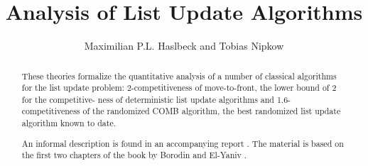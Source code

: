 \documentclass[11pt,a4paper]{article}
\begin{document}
\title{Analysis of List Update Algorithms}
\author{Maximilian P.L. Haslbeck and Tobias Nipkow}
\maketitle

\begin{abstract}
These theories formalize the quantitative analysis of a number of classical algorithms for the list update problem: 2-competitiveness of move-to-front, the lower bound of 2 for the competitive- ness of deterministic list update algorithms and 1.6-competitiveness of the randomized COMB algorithm, the best randomized list update algorithm known to date.

An informal description is found in an accompanying report \cite{HaslbeckN}.
The material is based on the first two chapters of the book by Borodin
and El-Yaniv \cite{BorodinE}.
\end{abstract}

\setcounter{tocdepth}{2}
\tableofcontents
\newpage





\end{document}

